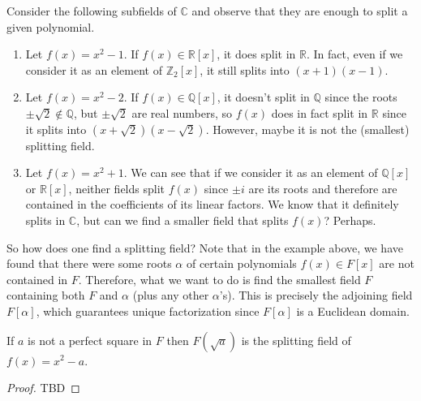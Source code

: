   \begin{example}
    Consider the following subfields of $\mathbb{C}$ and observe that they are enough to split a given polynomial. 
    \begin{enumerate}
      \item Let $f(x) = x^2 - 1$. If $f(x) \in \mathbb{R}[x]$, it does split in $\mathbb{R}$. In fact, even if we consider it as an element of $\mathbb{Z}_2 [x]$, it still splits into $(x + 1)(x - 1)$. 
      \item Let $f(x) = x^2 - 2$. If $f(x) \in \mathbb{Q}[x]$, it doesn't split in $\mathbb{Q}$ since the roots $\pm \sqrt{2} \not\in \mathbb{Q}$, but $\pm \sqrt{2}$ are real numbers, so $f(x)$ does in fact split in $\mathbb{R}$ since it splits into $(x + \sqrt{2}) (x - \sqrt{2})$. However, maybe it is not the (smallest) splitting field. 
      \item Let $f(x) = x^2 + 1$. We can see that if we consider it as an element of $\mathbb{Q}[x]$ or $\mathbb{R}[x]$, neither fields split $f(x)$ since $\pm i$ are its roots and therefore are contained in the coefficients of its linear factors. We know that it definitely splits in $\mathbb{C}$, but can we find a smaller field that splits $f(x)$? Perhaps.  
    \end{enumerate}
  \end{example}

  So how does one find a splitting field? Note that in the example above, we have found that there were some roots $\alpha$ of certain polynomials $f(x) \in F[x]$ are not contained in $F$. Therefore, what we want to do is find the smallest field $F$ containing both $F$ and $\alpha$ (plus any other $\alpha$'s). This is precisely the adjoining field $F[\alpha]$, which guarantees unique factorization since $F[\alpha]$ is a Euclidean domain. 

  \begin{lemma}
    If $a$ is not a perfect square in $F$ then $F(\sqrt{a})$ is the splitting field of $f(x) = x^2 - a$. 
  \end{lemma}
  \begin{proof}
    TBD
  \end{proof}

